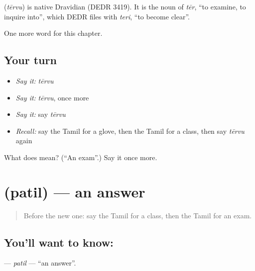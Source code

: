 \begin{cousinweb}
\textbf{} (\emph{tērvu}) is native Dravidian (DEDR 3419). It is the noun of \emph{tēr}, \textquotedblleft{}to examine, to inquire into\textquotedblright{}, which DEDR files with \emph{teri}, \textquotedblleft{}to become clear\textquotedblright{}.
\end{cousinweb}

\begin{grammarlens}[title={What you've built}]
One more word for this chapter.
\end{grammarlens}

\subsection*{Your turn}
\begin{itemize}
\raggedright
  \item \emph{Say it:} \emph{tērvu}
  \item \emph{Say it:} \emph{tērvu}, once more
  \item \emph{Say it:} say \emph{tērvu}
  \item \emph{Recall:} say the Tamil for a glove, then the Tamil for a class, then say \emph{tērvu} again
\end{itemize}

\begin{tcolorbox}[breakable,colback=teal!4,colframe=teal!35!black,title={Before you move on}]
What does  mean? (\textquotedblleft{}An exam\textquotedblright{}.) Say it once more.
\end{tcolorbox}
\section[\texorpdfstring{\ta{பதில்} (patil)}{பதில் (patil)}]{ (patil) — an answer}

\label{lesson:TA-C138-patil}



\begin{quote}
Before the new one: say the Tamil for a class, then the Tamil for an exam.
\end{quote}

\subsection*{You'll want to know: }
\textbf{} — \emph{patil} — \textquotedblleft{}an answer\textquotedblright{}.

